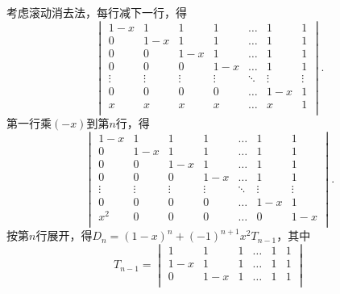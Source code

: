 \documentclass[UTF8,12pt,a4paper,fontset=fandol]{ctexart}
\begin{document}
\begin{solve}
考虑滚动消去法，每行减下一行，得
            \[ \begin{vmatrix}
                    1-x    & 1      & 1      & 1      & \ldots & 1      & 1      \\
                    0      & 1-x    & 1      & 1      & \ldots & 1      & 1      \\
                    0      & 0      & 1-x    & 1      & \ldots & 1      & 1      \\
                    0      & 0      & 0      & 1-x    & \ldots & 1      & 1      \\
                    \vdots & \vdots & \vdots & \vdots & \ddots & \vdots & \vdots \\
                    0      & 0      & 0      & 0      & \ldots & 1-x    & 1      \\
                    x      & x      & x      & x      & \ldots & x      & 1      \\
                \end{vmatrix}. \]
            第一行乘$(-x)$到第$n$行，得
            \[\begin{vmatrix}
                    1-x    & 1      & 1      & 1      & \ldots & 1      & 1      \\
                    0      & 1-x    & 1      & 1      & \ldots & 1      & 1      \\
                    0      & 0      & 1-x    & 1      & \ldots & 1      & 1      \\
                    0      & 0      & 0      & 1-x    & \ldots & 1      & 1      \\
                    \vdots & \vdots & \vdots & \vdots & \ddots & \vdots & \vdots \\
                    0      & 0      & 0      & 0      & \ldots & 1-x    & 1      \\
                    x^2    & 0      & 0      & 0      & \ldots & 0      & 1-x    \\
                \end{vmatrix}.\]
            按第$n$行展开，得$D_n=(1-x)^n+(-1)^{n+1}x^2T_{n-1}$，其中
            \[T_{n-1}=\begin{vmatrix}
                    1      & 1      & 1      & \ldots & 1      & 1      \\
                    1-x    & 1      & 1      & \ldots & 1      & 1      \\
                    0      & 1-x    & 1      & \ldots & 1      & 1      \\

\end{vmatrix}\]
\end{solve}
\end{document}
